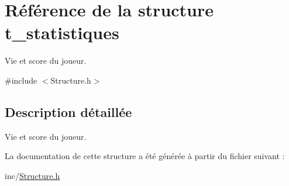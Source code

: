 \hypertarget{structt__statistiques}{}\section{Référence de la structure t\+\_\+statistiques}
\label{structt__statistiques}


Vie et score du joueur.  




{\ttfamily \#include $<$Structure.\+h$>$}



\subsection{Description détaillée}
Vie et score du joueur. 

La documentation de cette structure a été générée à partir du fichier suivant \+:\begin{DoxyCompactItemize}
\item 
inc/\hyperlink{Structure_8h}{Structure.\+h}\end{DoxyCompactItemize}
